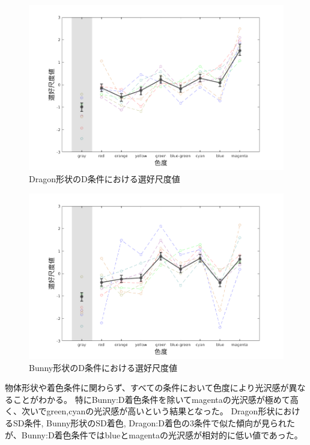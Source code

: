         \begin{figure}[h]
            \centering
            \includegraphics[width=14.0cm]{./img/ex1_res_DD_p.png}
            \caption{Dragon形状のD条件における選好尺度値}
            \label{ex1_DD}
        \end{figure}

        \begin{figure}[h]
            \centering
            \includegraphics[width=14.0cm]{./img/ex1_res_BD_p.png}
            \caption{Bunny形状のD条件における選好尺度値}
            \label{ex1_BD}
        \end{figure}

        物体形状や着色条件に関わらず、すべての条件において色度により光沢感が異なることがわかる。
        特にBunny:D着色条件を除いてmagentaの光沢感が極めて高く、次いでgreen,cyanの光沢感が高いという結果となった。
        Dragon形状におけるSD条件, Bunny形状のSD着色, Dragon:D着色の3条件で似た傾向が見られたが、Bunny:D着色条件ではblueとmagentaの光沢感が相対的に低い値であった。

